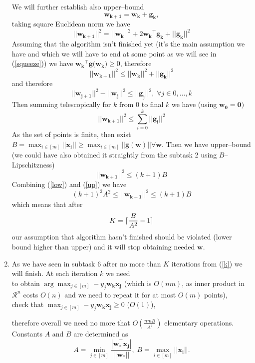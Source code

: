 \documentclass[]{article}
\DeclarePairedDelimiter\ceil{\lceil}{\rceil}
\begin{document}
\begin{enumerate}
	We will further establish also upper--bound
	$$ \mathbf{w_{k+1}}=\mathbf{w_{k}}+\mathbf{g_{k}},$$
	taking square Euclidean norm we have
	$$||\mathbf{w_{k+1}}||^2=||\mathbf{w_{k}}||^2+2\mathbf{w_{k}}^\top\mathbf{g_{k}}+||\mathbf{g_{k}}||^2$$
	Assuming that the algorithm isn't finished yet (it's the main assumption we have and which we will have to end at some point as we will see in (\ref{squeeze})) we have $\mathbf{w_{k}}^\top\mathbf{g}(\mathbf{w_{k})}\ge0$, therefore
	$$
	||\mathbf{w_{k+1}}||^2\le||\mathbf{w_{k}}||^2+||\mathbf{g_{k}}||^2$$
	and therefore
	$$
	||\mathbf{w_{j+1}}||^2-||\mathbf{w_{j}}||^2\le||\mathbf{g_{j}}||^2, \;\forall j\in 0,\ldots, k$$
	Then summing telescopically for $k$ from $0$ to final $k$ we have (using $\mathbf{w_{0}}=\mathbf{{0}})$
	$$||\mathbf{w_{k+1}}||^2\le\sum_{i=0}^k||\mathbf{g_{i}}||^2$$
	As the set of points is finite, then exist $B=\max_{i\in [m]}||\mathbf{x_i}||\ge\max_{i\in [m]}||\mathbf{g(w)}|| \forall \mathbf{w}.$ Then we have upper--bound (we could have also obtained it straightly from the subtask 2 using $B$--Lipschitzness)
	\begin{equation}
	\label{up}
	||\mathbf{w_{k+1}}||^2\le(k+1)B
	\end{equation}
	Combining (\ref{low}) and (\ref{up}) we have 
	\begin{equation}
	\label{squeeze}
	(k+1)^2A^2\le ||\mathbf{w_{k+1}}||^2\le (k+1)B 
	\end{equation}
	which means that after 
	\begin{equation}
	\label{k}
K=\ceil{\frac{B}{A^2} - 1}
	\end{equation} our assumption that algorithm hasn't finished should be violated (lower bound higher than upper) and it will stop obtaining needed $\mathbf{w}$.
	
	\item As we have seen in subtask 6 after no more than $K$ iterations from (\ref{k}) we will finish. At each iteration $k$ we need\\
	
	 to obtain $\arg\max_{j\in [m]} -y_j\mathbf{w_k}\mathbf{x_j}$ (which is $O(nm)$, as inner product in $\mathcal{R}^n$ costs $O(n)$ and we need to repeat it for at most $O(m)$ points),\\
	 
	  check that $\max_{j\in [m]} -y_j\mathbf{w_k}\mathbf{x_j} \ge 0$ ($O(1)$), 
	  
	  therefore overall we need no more that $O(\frac{nmB}{A^2})$ elementary operations.
	  Constants $A$ and $B$ are determined as
	  $$A=\min_{j\in [m]}\frac{|\mathbf{w_*^\top} \mathbf{x_j}|}{||\mathbf{w_*}||}, \;B=\max_{i\in [m]}||\mathbf{x_i}||.$$



\end{enumerate}
\end{document}
